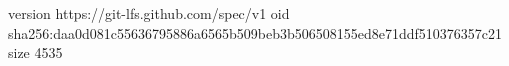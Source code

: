 version https://git-lfs.github.com/spec/v1
oid sha256:daa0d081c55636795886a6565b509beb3b506508155ed8e71ddf510376357c21
size 4535
